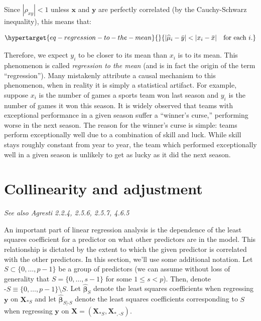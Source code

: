 \documentclass[
  11pt,
  letterpaper,
  oneside]{book}
\theoremstyle{definition}
\theoremstyle{plain}
\theoremstyle{plain}
\theoremstyle{plain}
\theoremstyle{remark}
\begin{document}
Since \(|\rho_{xy}| < 1\) unless \(\boldsymbol{x}\) and
\(\boldsymbol{y}\) are perfectly correlated (by the Cauchy-Schwarz
inequality), this means that:

\begin{equation}\protect\hypertarget{eq-regression-to-the-mean}{}{
|\widehat{\mu}_i - \bar{y}| < |x_i - \bar{x}| \quad \text{for each } i.
}\label{eq-regression-to-the-mean}\end{equation}

Therefore, we expect \(y_i\) to be closer to its mean than \(x_i\) is to
its mean. This phenomenon is called \emph{regression to the mean} (and
is in fact the origin of the term ``regression''). Many mistakenly
attribute a causal mechanism to this phenomenon, when in reality it is
simply a statistical artifact. For example, suppose \(x_i\) is the
number of games a sports team won last season and \(y_i\) is the number
of games it won this season. It is widely observed that teams with
exceptional performance in a given season suffer a ``winner's curse,''
performing worse in the next season. The reason for the winner's curse
is simple: teams perform exceptionally well due to a combination of
skill and luck. While skill stays roughly constant from year to year,
the team which performed exceptionally well in a given season is
unlikely to get as lucky as it did the next season.

\hypertarget{sec-collinearity}{%
\chapter{Collinearity and adjustment}\label{sec-collinearity}}

\emph{See also Agresti 2.2.4, 2.5.6, 2.5.7, 4.6.5}

An important part of linear regression analysis is the dependence of the
least squares coefficient for a predictor on what other predictors are
in the model. This relationship is dictated by the extent to which the
given predictor is correlated with the other predictors. In this
section, we'll use some additional notation. Let
\(S \subset \{0, \dots, p-1\}\) be a group of predictors (we can assume
without loss of generality that \(S = \{0, \dots, s-1\}\) for some
\(1 \leq s < p\)). Then, denote
\(\text{-}S \equiv \{0, \dots, p-1\} \setminus S\). Let
\(\boldsymbol{\widehat{\beta}}_S\) denote the least squares coefficients
when regressing \(\boldsymbol{y}\) on \(\boldsymbol{X}_{*S}\) and let
\(\boldsymbol{\widehat{\beta}}_{S|\text{-}S}\) denote the least squares
coefficients corresponding to \(S\) when regressing \(\boldsymbol{y}\)
on
\(\boldsymbol{X} = (\boldsymbol{X}_{*S}, \boldsymbol{X}_{*,\text{-}S})\).
\end{document}
